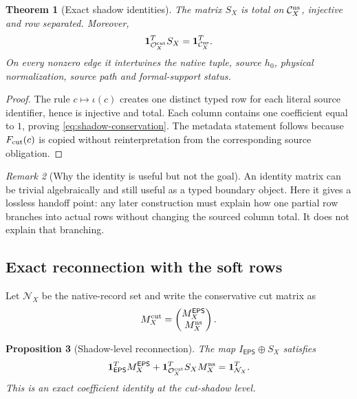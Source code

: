 \documentclass[11pt]{article}
\newtheorem{theorem}{Theorem}[section]
\newtheorem{proposition}[theorem]{Proposition}
\theoremstyle{definition}
\theoremstyle{remark}
\newtheorem{remark}[theorem]{Remark}
\newcommand{\EPS}{\mathsf{EPS}}
\newcommand{\Cns}{\mathcal C_X^{\rm ns}}
\newcommand{\Ocut}{\mathcal O_X^{\rm cut}}
\newcommand{\one}{\mathbf 1}
\begin{document}
\begin{theorem}[Exact shadow identities]
\label{thm:shadow}
The matrix \(S_X\) is total on \(\Cns\), injective and row separated.
Moreover,
\begin{equation}
 \one_{\Ocut}^{T}S_X=\one_{\Cns}^{T}.
 \label{eq:shadow-conservation}
\end{equation}
On every nonzero edge it intertwines the native tuple, source
\(h_0\), physical normalization, source path and formal-support
status.
\end{theorem}

\begin{proof}
The rule \(c\mapsto\iota(c)\) creates one distinct typed row for each
literal source identifier, hence is injective and total.  Each column
contains one coefficient equal to \(1\), proving
\eqref{eq:shadow-conservation}.  The metadata statement follows
because \(F_{\rm cut}(c)\) is copied without reinterpretation from
the corresponding source obligation.
\end{proof}

\begin{remark}[Why the identity is useful but not the goal]
An identity matrix can be trivial algebraically and still useful as a
typed boundary object.  Here it gives a lossless handoff point: any
later construction must explain how one partial row branches into
actual rows without changing the sourced column total.  It does not
explain that branching.
\end{remark}

\subsection{Exact reconnection with the soft rows}

Let \(\mathcal N_X\) be the native-record set and write the
conservative cut matrix as
\[
 M_X^{\rm cut}=
 \begin{pmatrix}
 M_X^{\EPS}\\ M_X^{\rm ns}
 \end{pmatrix}.
\]

\begin{proposition}[Shadow-level reconnection]
\label{prop:reconnection}
The map \(I_{\EPS}\oplus S_X\) satisfies
\begin{equation}
 \one_{\EPS}^{T}M_X^{\EPS}
 +\one_{\Ocut}^{T}S_XM_X^{\rm ns}
 =\one_{\mathcal N_X}^{T}.
 \label{eq:reconnection}
\end{equation}
This is an exact coefficient identity at the cut-shadow level.
\end{proposition}
\end{document}
